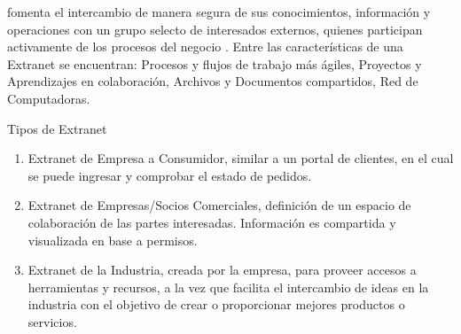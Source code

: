 \documentclass[a4paper,12pt]{article}
\begin{document}
fomenta el intercambio de manera segura de sus conocimientos, información y 
operaciones con un grupo selecto de interesados externos, quienes participan 
activamente de los procesos del negocio \cite{Cabello2014}. 
Entre las características de una Extranet se encuentran: Procesos y flujos de 
trabajo más ágiles, Proyectos y Aprendizajes en colaboración, Archivos y Documentos 
compartidos, Red de Computadoras.\\ 
\newline
\begin{bf}  
Tipos de Extranet\\
\end{bf}
\begin{enumerate}    
\item Extranet de Empresa a Consumidor, similar a un portal de clientes, en el cual se 
puede ingresar y comprobar el estado de pedidos. 
\item Extranet de Empresas/Socios Comerciales, definición de un espacio de colaboración 
de las partes interesadas. Información es compartida y visualizada en base a 
permisos.
\item Extranet de la Industria, creada por la empresa, para proveer accesos a herramientas 
y recursos, a la vez que facilita el intercambio de ideas en la industria con el objetivo de crear o proporcionar mejores productos o servicios.\\ 
\end{enumerate}


\end{document}
